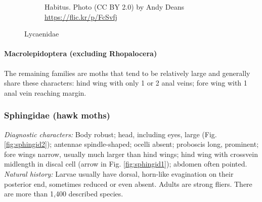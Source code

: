 \documentclass[letterpaper, 11pt]{article}
\begin{document}
\begin{figure}[ht!]
\begin{subfigure}[ht!]{0.5\textwidth}
        \caption{Habitus. Photo (CC BY 2.0) by Andy Deans \url{https://flic.kr/p/FcSvfj}}
        \label{fig:lycaenid2}
    \end{subfigure}
    \caption{Lycaenidae}\label{fig:lycaenids}
\end{figure}

\FloatBarrier
\paragraph{Macrolepidoptera (excluding Rhopalocera)} The remaining families are moths that tend to be relatively large and generally share these characters: hind wing with only 1 or 2 anal veins; fore wing with 1 anal vein reaching margin.\\

\subsubsection{Sphingidae (hawk moths)}
\noindent{}\textit{Diagnostic characters:} Body robust; head, including eyes, large (Fig. \ref{fig:sphingid2}); antennae spindle-shaped; ocelli absent; proboscis long, prominent; fore wings narrow, usually much larger than hind wings; hind wing with crossvein midlength in discal cell (arrow in Fig. \ref{fig:sphingid1}); abdomen often pointed.\\

\noindent{}\textit{Natural history:} Larvae usually have dorsal, horn-like evagination on their posterior end, sometimes reduced or even absent. Adults are strong fliers. There are more than 1,400 described species.
\end{document}
